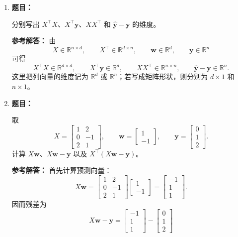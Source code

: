 \documentclass[11pt,a4paper]{article}
\newcommand{\R}{\mathbb{R}}
\newcommand{\ans}{\textcolor{answerblue}{\textbf{参考解答：}}}
\newenvironment{question}{%
  \par\begingroup\color{black!82}\noindent\textbf{题目：}\ignorespaces
}{%
  \par\endgroup\smallskip
}
\begin{document}
\begin{enumerate}
  \item
  \begin{question}
  分别写出 $X^\top X$、$X^\top\bm y$、$XX^\top$ 和
  $\hat{\bm y}-\bm y$ 的维度。
  \end{question}
  \ans
  由
  \[
    X\in\R^{n\times d},\qquad X^\top\in\R^{d\times n},
    \qquad \bm w\in\R^d,\qquad \bm y\in\R^n
  \]
  可得
  \[
    X^\top X\in\R^{d\times d},\qquad
    X^\top\bm y\in\R^d,\qquad
    XX^\top\in\R^{n\times n},\qquad
    \hat{\bm y}-\bm y\in\R^n.
  \]
  这里把列向量的维度记为 $\R^d$ 或 $\R^n$；若写成矩阵形状，则分别为
  $d\times1$ 和 $n\times1$。

  \item
  \begin{question}
  取
  \[
    X=\begin{bmatrix}
      1&2\\
      0&-1\\
      2&1
    \end{bmatrix},\qquad
    \bm w=\begin{bmatrix}1\\-1\end{bmatrix},\qquad
    \bm y=\begin{bmatrix}0\\1\\2\end{bmatrix}.
  \]
  计算 $X\bm w$、$X\bm w-\bm y$ 以及
  $X^\top(X\bm w-\bm y)$。
  \end{question}
  \ans
  首先计算预测向量：
  \[
    X\bm w
    =\begin{bmatrix}
       1&2\\0&-1\\2&1
     \end{bmatrix}
     \begin{bmatrix}1\\-1\end{bmatrix}
    =\begin{bmatrix}-1\\1\\1\end{bmatrix}.
  \]
  因而残差为
  \[
    X\bm w-\bm y
    =\begin{bmatrix}-1\\1\\1\end{bmatrix}
     -\begin{bmatrix}0\\1\\2\end{bmatrix}
\]
\end{enumerate}
\end{document}

